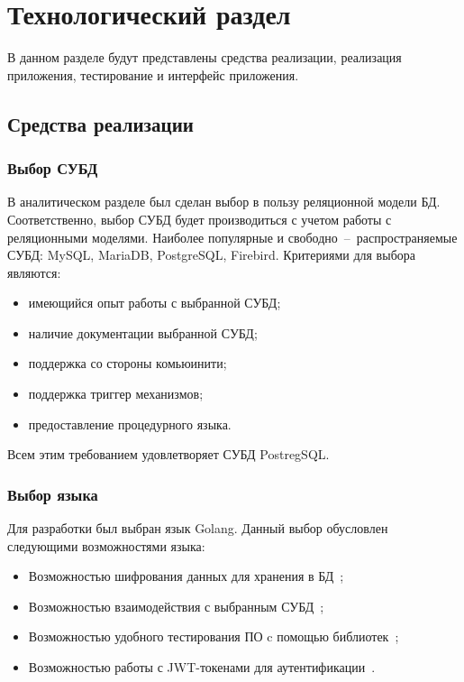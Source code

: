 \chapter{Технологический раздел}


В данном разделе будут представлены средства реализации, реализация приложения, тестирование и интерфейс приложения.


\section{Средства реализации}

\subsection{Выбор СУБД}
В аналитическом разделе был сделан выбор в пользу реляционной модели БД.
Соответственно, выбор СУБД будет производиться с учетом работы с реляционными моделями.
Наиболее популярные и свободно~--~распространяемые СУБД: MySQL, MariaDB, PostgreSQL, Firebird.
Критериями для выбора являются:
\begin{itemize}
	\item имеющийся опыт работы с выбранной СУБД;
	\item наличие документации выбранной СУБД;
	\item поддержка со стороны комьюинити;
	\item поддержка триггер механизмов;
	\item предоставление процедурного языка.
\end{itemize}

Всем этим требованием удовлетворяет СУБД PostregSQL.

\subsection{Выбор языка}
Для разработки был выбран язык Golang. Данный выбор обусловлен следующими возможностями языка:
\begin{itemize}
	\item Возможностью шифрования данных для хранения в БД~\cite{golang_crypt};
	\item Возможностью взаимодействия с выбранным СУБД~\cite{golang_dbms};
	\item Возможностью удобного тестирования ПО c помощью библиотек~\cite{golang_testing};
	\item Возможностью работы с JWT-токенами для аутентификации~\cite{golang_jwt}.
\end{itemize}



